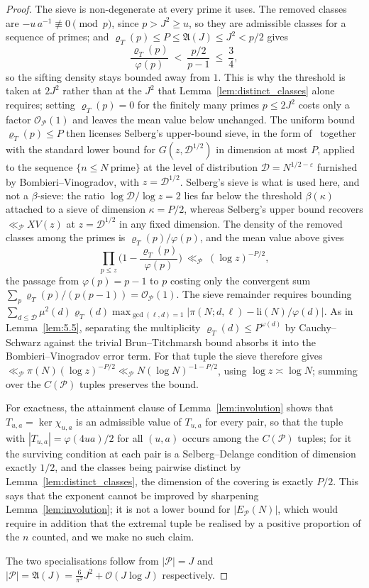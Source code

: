 \documentclass[11pt, a4paper]{article}
\theoremstyle{plain}
\theoremstyle{definition}
\begin{document}
\begin{proof}
The sieve is non-degenerate at every prime it uses. The removed classes are $-u\,a^{-1}\not\equiv0\pmod p$, since $p>J^{2}\ge u$, so they are admissible classes for a sequence of primes; and $\varrho_T(p)\le P\le\mathfrak{A}(J)\le J^{2}<p/2$ gives
$$\frac{\varrho_T(p)}{\varphi(p)}\ <\ \frac{p/2}{p-1}\ \le\ \frac34 ,$$
so the sifting density stays bounded away from $1$. This is why the threshold is taken at $2J^{2}$ rather than at the $J^{2}$ that Lemma~\ref{lem:distinct_classes} alone requires; setting $\varrho_T(p)=0$ for the finitely many primes $p\le2J^{2}$ costs only a factor $\mathcal{O}_{\mathcal{P}}(1)$ and leaves the mean value below unchanged. The uniform bound $\varrho_T(p)\le P$ then licenses Selberg's upper-bound sieve, in the form of~\cite[Thm.~3.2]{halberstam_richert} together with the standard lower bound for $G(z,\mathcal{D}^{1/2})$ in dimension at most $P$, applied to the sequence $\{n\le N\ \text{prime}\}$ at the level of distribution $\mathcal{D}=N^{1/2-\varepsilon}$ furnished by Bombieri--Vinogradov, with $z=\mathcal{D}^{1/2}$. Selberg's sieve is what is used here, and not a $\beta$-sieve: the ratio $\log\mathcal{D}/\log z=2$ lies far below the threshold $\beta(\kappa)$ attached to a sieve of dimension $\kappa=P/2$, whereas Selberg's upper bound recovers $\ll_{\mathcal{P}}XV(z)$ at $z=\mathcal{D}^{1/2}$ in any fixed dimension. The density of the removed classes among the primes is $\varrho_T(p)/\varphi(p)$, and the mean value above gives
$$\prod_{p\le z}\Big(1-\frac{\varrho_T(p)}{\varphi(p)}\Big)\ \ll_{\mathcal{P}}\ (\log z)^{-P/2},$$
the passage from $\varphi(p)=p-1$ to $p$ costing only the convergent sum $\sum_p\varrho_T(p)/(p(p-1))=\mathcal{O}_{\mathcal{P}}(1)$. The sieve remainder requires bounding $\sum_{d\le\mathcal{D}}\mu^2(d)\varrho_T(d)\max_{\gcd(\ell,d)=1}|\pi(N;d,\ell)-\mathrm{li}(N)/\varphi(d)|$. As in Lemma~\ref{lem:5.5}, separating the multiplicity $\varrho_T(d)\le P^{\omega(d)}$ by Cauchy--Schwarz against the trivial Brun--Titchmarsh bound absorbs it into the Bombieri--Vinogradov error term. For that tuple the sieve therefore gives $\ll_{\mathcal{P}}\pi(N)(\log z)^{-P/2}\ll_{\mathcal{P}}N(\log N)^{-1-P/2}$, using $\log z\asymp\log N$; summing over the $C(\mathcal{P})$ tuples preserves the bound.

For exactness, the attainment clause of Lemma~\ref{lem:involution} shows that $T_{u,a}=\ker\chi_{u,a}$ is an admissible value of $T_{u,a}$ for every pair, so that the tuple with $|T_{u,a}|=\varphi(4ua)/2$ for all $(u,a)$ occurs among the $C(\mathcal{P})$ tuples; for it the surviving condition at each pair is a Selberg--Delange condition of dimension exactly $1/2$, and the classes being pairwise distinct by Lemma~\ref{lem:distinct_classes}, the dimension of the covering is exactly $P/2$. This says that the exponent cannot be improved by sharpening Lemma~\ref{lem:involution}; it is not a lower bound for $|E_{\mathcal{P}}(N)|$, which would require in addition that the extremal tuple be realised by a positive proportion of the $n$ counted, and we make no such claim.

The two specialisations follow from $|\mathcal{P}|=J$ and $|\mathcal{P}|=\mathfrak{A}(J)=\frac{6}{\pi^{2}}J^{2}+\mathcal{O}(J\log J)$ respectively.
\end{proof}
\end{document}
